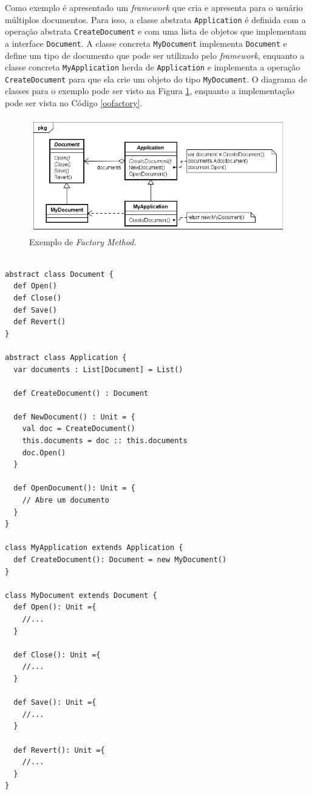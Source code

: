 Como exemplo é apresentado um \textit{framework} 
que cria e apresenta para o usuário múltiplos 
documentos. Para isso, a classe abstrata 
\texttt{Application} é definida com a operação abstrata 
\texttt{CreateDocument} e com uma lista de objetos 
que implementam a interface \texttt{Document}. A classe 
concreta \texttt{MyDocument} implementa \texttt{Document} e define 
um tipo de documento que pode ser utilizado pelo 
\textit{framework}, enquanto a classe concreta 
\texttt{MyApplication} herda de \texttt{Application} e implementa 
a operação \texttt{CreateDocument} para que ela crie 
um objeto do tipo \texttt{MyDocument}. O diagrama de classes 
para o exemplo pode ser visto na Figura \ref{fmethod_example}, 
enquanto a implementação pode ser vista no 
Código \ref{oofactory}.


\begin{figure}[htb]
	\caption{\label{fmethod_example}Exemplo de \textit{Factory Method}.}
	\begin{center}
	    \includegraphics[scale=0.5]{5_padroes-contexto-funcional/5.1_criacionais/5.1.1_factory-method/factorymethod_exemplo.png}
	\end{center}
\end{figure}

\begin{lstlisting}[caption={Factory Method Orientado a Objetos},label=oofactory]
    
abstract class Document {
  def Open()
  def Close()
  def Save()
  def Revert()
}

abstract class Application {
  var documents : List[Document] = List()

  def CreateDocument() : Document

  def NewDocument() : Unit = {
    val doc = CreateDocument()
    this.documents = doc :: this.documents
    doc.Open()
  }

  def OpenDocument(): Unit = {
    // Abre um documento
  }
}

class MyApplication extends Application {
  def CreateDocument(): Document = new MyDocument()
}

class MyDocument extends Document {
  def Open(): Unit ={
    //...
  }

  def Close(): Unit ={
    //...
  }

  def Save(): Unit ={
    //...
  }

  def Revert(): Unit ={
    //...
  }
}

\end{lstlisting}

